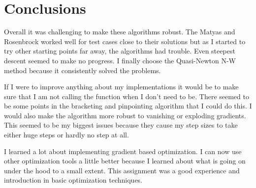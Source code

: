 \documentclass{article}
\begin{document}
\section*{Conclusions}

Overall it was challenging to make these algorithms robust. The Matyas and Rosenbrock worked well for test cases close to their solutions but as I started to try other starting points far away, the algorithms had trouble. Even steepest descent seemed to make no progress. I finally choose the Quasi-Newton N-W method because it consistently solved the problems. 

If I were to improve anything about my implementations it would be to make sure that I am not calling the function when I don't need to be. There seemed to be some points in the bracketing and pinpointing algorithm that I could do this. I would also make the algorithm more robust to vanishing or exploding gradients. This seemed to be my biggest issues because they cause my step sizes to take either huge steps or hardly no step at all.

I learned a lot about implementing gradient based optimization. I can now use other optimization tools a little better because I learned about what is going on under the hood to a small extent. This assignment was a good experience and introduction in basic optimization techniques.



\end{document}
